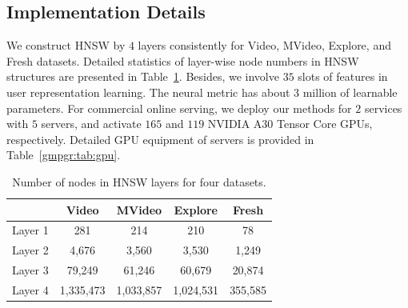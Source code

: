 \begin{algorithm}
    \caption{Inter-query HiPANNS}
    \label{gmpgr:alg:q_hipanns}
    \LinesNumbered
\end{algorithm}


\subsection{Implementation Details}\label{gmpgr:sec:appendix_implementation}

We construct HNSW by $4$ layers consistently for Video, MVideo, Explore, and Fresh datasets. Detailed statistics of layer-wise node numbers in HNSW structures are presented in Table~\ref{gmpgr:tab:nodes}.
Besides, we involve $35$ slots of features in user representation learning.
The neural metric has about $3$ million of learnable parameters.
For commercial online serving, we deploy our methods for $2$ services with $5$ servers, and activate $165$ and $119$ NVIDIA A30 Tensor Core GPUs, respectively. 
Detailed GPU equipment of servers is provided in Table~\ref{gmpgr:tab:gpu}.

\begin{table}[t]
    \centering
    \caption{Number of nodes in HNSW layers for four datasets.}
    \label{gmpgr:tab:nodes}
    \begin{tabular}{c|cccc}
        \toprule
         & Video & MVideo & Explore & Fresh \\
        \midrule
        Layer 1 & 281 & 214 & 210 & 78 \\
        Layer 2 & 4,676 & 3,560 & 3,530 & 1,249 \\
        Layer 3 & 79,249 & 61,246 & 60,679 & 20,874 \\
        Layer 4 & 1,335,473 & 1,033,857 & 1,024,531 & 355,585 \\
        \bottomrule
    \end{tabular}
\end{table}

